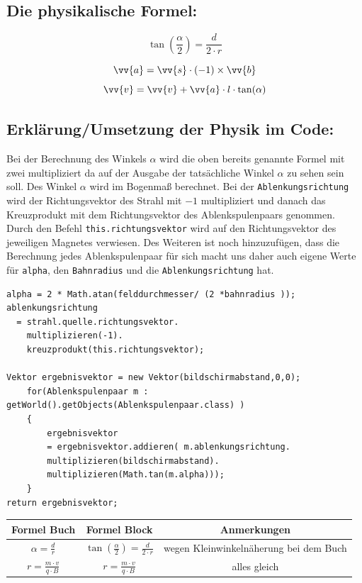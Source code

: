 \subsection{Die physikalische Formel:}
\begin{equation}
    \label{eq:tan}
    \tan(\frac{\alpha}{2}) = \frac{d}{2 \cdot r}
\end{equation}

\begin{equation}
    \label{eq:a}
    \vv{a} = \vv{s} \cdot (-1) \times \vv{b}
\end{equation}
\begin{equation}
    \label{eq:v}
    \vv{v} = \vv{v} + \vv{a} \cdot l \cdot \tan(\alpha)
\end{equation}

\subsection{Erklärung/Umsetzung der Physik im Code:}
 Bei der Berechnung des Winkels $\alpha$ wird die oben %
bereits genannte Formel mit zwei multipliziert da auf der Ausgabe der tatsächliche Winkel $\alpha$ zu sehen sein soll. Des Winkel $\alpha$ wird im Bogenmaß berechnet. Bei der \lstinline$Ablenkungsrichtung$ wird der Richtungsvektor des Strahl mit $-1$ multipliziert und danach das Kreuzprodukt mit dem Richtungsvektor des Ablenkspulenpaars genommen. Durch den Befehl \lstinline$this.richtungsvektor$ wird auf den Richtungsvektor des jeweiligen Magnetes verwiesen. Des Weiteren ist noch hinzuzufügen, dass die Berechnung jedes Ablenkspulenpaar für sich macht uns daher auch eigene Werte für \lstinline$alpha$, den \lstinline$Bahnradius$ und die \lstinline$Ablenkungsrichtung$ hat.
\begin{lstlisting}
alpha = 2 * Math.atan(felddurchmesser/ (2 *bahnradius ));
ablenkungsrichtung
  = strahl.quelle.richtungsvektor.
    multiplizieren(-1).
    kreuzprodukt(this.richtungsvektor);

Vektor ergebnisvektor = new Vektor(bildschirmabstand,0,0);
    for(Ablenkspulenpaar m : getWorld().getObjects(Ablenkspulenpaar.class) )
    {
        ergebnisvektor 
        = ergebnisvektor.addieren( m.ablenkungsrichtung.
        multiplizieren(bildschirmabstand).
        multiplizieren(Math.tan(m.alpha)));
    }
return ergebnisvektor;

\end{lstlisting}

\begin{tabular}{c|c|c}
     Formel Buch & Formel Block & Anmerkungen  \\
     \hline
    $\alpha = \frac{d}{r}$ &$\tan(\frac{\alpha}{2}) = \frac{d}{2\cdot r}$& wegen Kleinwinkelnäherung bei dem Buch \\
    \hline
   $r = \frac{m\cdot v}{q\cdot B}$  & $r = \frac{m\cdot v}{q\cdot B}$& alles gleich 
     
\end{tabular}













 
